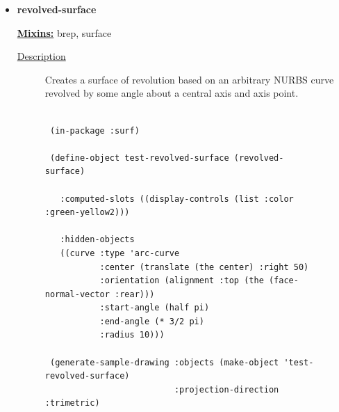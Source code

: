 \documentclass [11pt]{book}
\begin{document}
\begin{itemize}
\begin{description}
\begin{itemize}
\end{itemize}





\end{description}







\item {}
\label{prim:revolved-surface}
\textbf{revolved-surface}


\textbf{
\underline{Mixins:}} brep, surface





\begin{description}

\item [
\underline{Description}]


Creates a surface of revolution based on an arbitrary NURBS curve revolved by some angle about
a central axis and axis point.



\end{description}




\begin{figure}
\begin{lrbox}{\boxedverb}
\begin{minipage}{\linewidth}
{\small

\begin{verbatim}

 (in-package :surf)

 (define-object test-revolved-surface (revolved-surface)

   :computed-slots ((display-controls (list :color :green-yellow2)))

   :hidden-objects 
   ((curve :type 'arc-curve
           :center (translate (the center) :right 50)
           :orientation (alignment :top (the (face-normal-vector :rear)))
           :start-angle (half pi)
           :end-angle (* 3/2 pi)
           :radius 10)))
 
 (generate-sample-drawing :objects (make-object 'test-revolved-surface)
                          :projection-direction :trimetric)
 
 
\end{verbatim}}
\end{minipage}
\end{lrbox}
\fbox{\usebox{\boxedverb}}


\end{figure}
\end{itemize}
\end{document}
